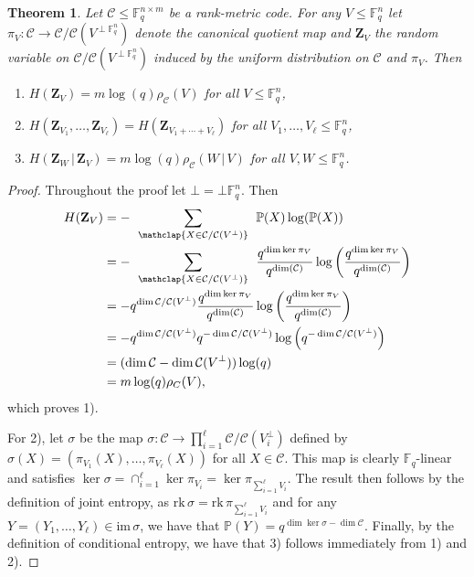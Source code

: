 \documentclass[onecolumn,draftclsnofoot,12pt]{IEEEtran}
\newcommand{\F}{\mathbb{F}}
\theoremstyle{plain} %
\newtheorem{theorem}{Theorem}
\theoremstyle{definition}
\begin{document}
\begin{theorem} \label{thm:entropy}
Let $\mathcal{C}\leq \mathbb{F}_q^{n\times m}$ be a rank-metric code. For any $V\leq \mathbb{F}_q^n$ let $\pi_V \colon \mathcal{C}\rightarrow \mathcal{C}/\mathcal{C}(V^{\perp \mathbb{F}_q^n})$ denote the canonical quotient map and $\mathbf{Z}_V$ the random variable on $\mathcal{C}/\mathcal{C}(V^{\perp\mathbb{F}_q^n})$ induced by the uniform distribution on $\mathcal{C}$ and $\pi_V$. Then
\begin{enumerate}
    \item $H(\mathbf{Z}_V)= m\log(q)\rho_{\mathcal{C}}(V)$ for all $V\leq \F_q^n$,
    \item $H(\mathbf{Z}_{V_1},\ldots,\mathbf{Z}_{V_\ell}) = H( \mathbf{Z}_{V_1+ \cdots + V_\ell})$ for all $V_1,\ldots,V_\ell\leq \F_q^n$,
    \item $H(\mathbf{Z}_{W} \,|\, \mathbf{Z}_{V})=m \log(q)\rho_{\mathcal{C}}(W\, |\, V)$ for all $V,W\leq \F_q^n$.
\end{enumerate}
\end{theorem}
\begin{proof}
Throughout the proof let $\bot = \bot \mathbb{F}_q^n$. 
Then
    \begin{align*}
     H(\mathbf{Z}_V) &= -\:\:\sum_{\mathclap{X\in \mathcal{C}/\mathcal{C}(V^\perp)}}\:\: \mathbb{P}(X) \log (\mathbb{P}(X)) \\
    &= -\:\:\sum_{\mathclap{X\in \mathcal{C}/\mathcal{C}(V^\perp)}}\:\: \frac{q^{\dim \ker \pi_V}}{q^{\dim (\mathcal{C})}} \log \left( \frac{q^{\dim \ker \pi_V}}{q^{\dim (\mathcal{C})}}\right)\\
    &= -q^{\dim \mathcal{C}/\mathcal{C}(V^\perp)}\frac{q^{\dim \ker \pi_V}}{q^{\dim (\mathcal{C})}} \log \left( \frac{q^{\dim \ker \pi_V}}{q^{\dim (\mathcal{C})}}\right) \\
    &= -q^{\dim \mathcal{C}/\mathcal{C}(V^\perp)}q^{-\dim \mathcal{C}/\mathcal{C}(V^\perp)} \log\left( q^{-\dim \mathcal{C}/\mathcal{C}(V^\perp)}\right) \\
    &= (\dim \mathcal{C} - \dim \mathcal{C}(V^\perp)) \log(q)\\ 
    &= m\log(q)\rho_C(V),
\end{align*}
which proves 1). 

For 2), let $\sigma$ be the map $\sigma \colon \mathcal{C} \rightarrow \prod^{\ell}_{i=1}\mathcal{C}/\mathcal{C}(V_i^\perp)$ defined by $\sigma(X)= (\pi_{V_1}(X),\ldots,\pi_{V_\ell}(X))$ for all $X \in \mathcal{C}$. This map is clearly $\mathbb{F}_q$-linear and satisfies $\ker \sigma = \cap^{\ell}_{i=1}\ker \pi_{V_i} = \ker \pi_{\sum_{i=1}^\ell V_i}$. The result then follows by the definition of joint entropy, as $\mathrm{rk}\, \sigma = \mathrm{rk}\, \pi_{\sum^{\ell}_{i=1} V_i}$ and for any $Y=(Y_1,\ldots,Y_\ell)\in \mathrm{im}\, \sigma$, we have that $\mathbb{P}(Y) = q^{\dim \ker \sigma - \dim \mathcal{C}}$. Finally, by the definition of conditional entropy, we have that 3) follows immediately from 1) and 2).\qedhere
\end{proof}
\end{document}
